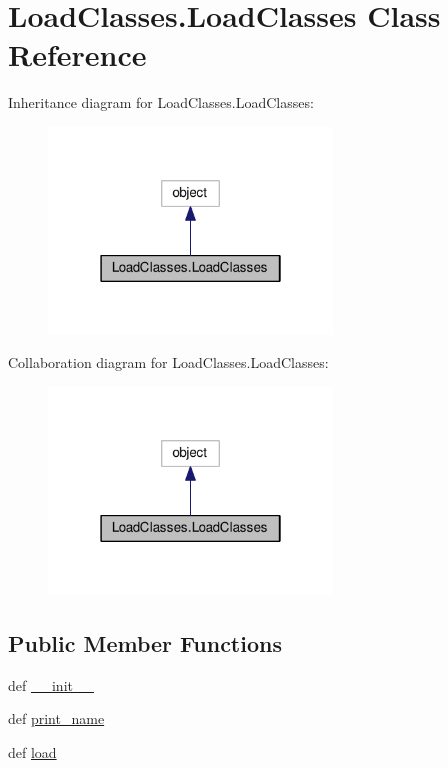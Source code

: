 \hypertarget{class_load_classes_1_1_load_classes}{\section{Load\-Classes.\-Load\-Classes Class Reference}
\label{class_load_classes_1_1_load_classes}
}


Inheritance diagram for Load\-Classes.\-Load\-Classes\-:
\nopagebreak
\begin{figure}[H]
\begin{center}
\leavevmode
\includegraphics[width=214pt]{class_load_classes_1_1_load_classes__inherit__graph}
\end{center}
\end{figure}


Collaboration diagram for Load\-Classes.\-Load\-Classes\-:
\nopagebreak
\begin{figure}[H]
\begin{center}
\leavevmode
\includegraphics[width=214pt]{class_load_classes_1_1_load_classes__coll__graph}
\end{center}
\end{figure}
\subsection*{Public Member Functions}
\begin{DoxyCompactItemize}
\item 
def \hyperlink{class_load_classes_1_1_load_classes_a9fe946ad6f966eb19a8877931c1dfe93}{\-\_\-\-\_\-init\-\_\-\-\_\-}
\item 
def \hyperlink{class_load_classes_1_1_load_classes_a4f90a379d556b30d456f402f8b368bee}{print\-\_\-name}
\item 
def \hyperlink{class_load_classes_1_1_load_classes_a9be449b4da8e5ab786f79c6388820727}{load}
\end{DoxyCompactItemize}
